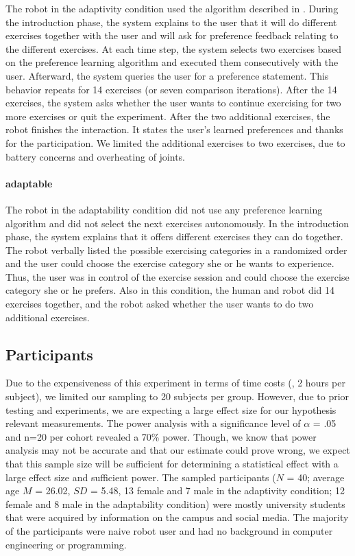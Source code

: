 \documentclass[twocolumn]{svjour3}          %
\begin{document}
The robot in the adaptivity condition used the algorithm described in
\autocite{wu2016double}. During the introduction phase, the system
explains to the user that it will do different exercises together with
the user and will ask for preference feedback relating to the different
exercises. At each time step, the system selects two exercises based on the preference learning algorithm and
executed them consecutively with the user. Afterward, the system queries
the user for a preference statement. This behavior repeats for 14
exercises (or seven comparison iterations). After the 14 exercises, the system asks
whether the user wants to continue exercising for two more exercises or
quit the experiment. After the two additional exercises, the robot
finishes the interaction. It states the user's learned preferences and
thanks for the participation. We limited the additional exercises to two
exercises, due to battery concerns and overheating of joints.

\hypertarget{adaptability}{%
\paragraph{adaptable}\label{adaptability}}

The robot in the adaptability condition did not use any preference
learning algorithm and did not select the next exercises autonomously.
In the introduction phase, the system explains that it offers different
exercises they can do together. The robot verbally listed the possible
exercising categories in a randomized order and the user could choose
the exercise category she or he wants to experience. Thus, the user was
in control of the exercise session and could choose the exercise
category she or he prefers. Also in this condition, the human and robot
did 14 exercises together, and the robot asked whether the user wants to
do two additional exercises.

\hypertarget{participants}{%
\subsection{Participants}\label{participants}}
Due to the expensiveness of this experiment in terms of time costs (\ie{}, 2 hours per subject), we limited our sampling to 20 subjects per group. However, due to prior testing and experiments, we are expecting a large effect size for our hypothesis relevant measurements. The power analysis with a significance level of $\alpha$ = .05 and n=20 per cohort revealed a 70\% power. Though, we know that power analysis may not be accurate and that our estimate could prove wrong, we expect that this sample size will be sufficient for determining a statistical effect with a large effect size and sufficient power. 
The sampled participants (\(N\) = 40; average age \(M\) = 26.02, \(SD\) = 5.48, 13
female and 7 male in the adaptivity condition; 12 female and 8 male in
the adaptability condition) were mostly university students that were
acquired by information on the campus and social media. The majority of
the participants were naive robot user and had no background in computer
engineering or programming.
\end{document}
